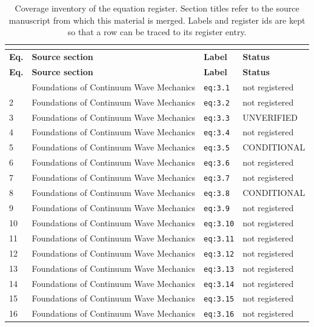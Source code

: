 \begin{longtable}{@{}p{1.1cm}p{5.6cm}p{3.4cm}p{2.9cm}@{}}
\caption{Coverage inventory of the equation register. Section titles refer to the source
manuscript from which this material is merged. Labels and register ids are kept so that
a row can be traced to its register entry.}\\
\label{tab:eqcoverage}\\
\toprule
\textbf{Eq.} & \textbf{Source section} & \textbf{Label} & \textbf{Status} \\
\midrule
\endfirsthead
\toprule
\textbf{Eq.} & \textbf{Source section} & \textbf{Label} & \textbf{Status} \\
\midrule
\endhead
\bottomrule
\endfoot
1 & Foundations of Continuum Wave Mechanics & \texttt{eq:3.1} & not registered \\
2 & Foundations of Continuum Wave Mechanics & \texttt{eq:3.2} & not registered \\
3 & Foundations of Continuum Wave Mechanics & \texttt{eq:3.3} & UNVERIFIED \\
4 & Foundations of Continuum Wave Mechanics & \texttt{eq:3.4} & not registered \\
5 & Foundations of Continuum Wave Mechanics & \texttt{eq:3.5} & CONDITIONAL \\
6 & Foundations of Continuum Wave Mechanics & \texttt{eq:3.6} & not registered \\
7 & Foundations of Continuum Wave Mechanics & \texttt{eq:3.7} & not registered \\
8 & Foundations of Continuum Wave Mechanics & \texttt{eq:3.8} & CONDITIONAL \\
9 & Foundations of Continuum Wave Mechanics & \texttt{eq:3.9} & not registered \\
10 & Foundations of Continuum Wave Mechanics & \texttt{eq:3.10} & not registered \\
11 & Foundations of Continuum Wave Mechanics & \texttt{eq:3.11} & not registered \\
12 & Foundations of Continuum Wave Mechanics & \texttt{eq:3.12} & not registered \\
13 & Foundations of Continuum Wave Mechanics & \texttt{eq:3.13} & not registered \\
14 & Foundations of Continuum Wave Mechanics & \texttt{eq:3.14} & not registered \\
15 & Foundations of Continuum Wave Mechanics & \texttt{eq:3.15} & not registered \\
16 & Foundations of Continuum Wave Mechanics & \texttt{eq:3.16} & not registered \\

\end{longtable}
